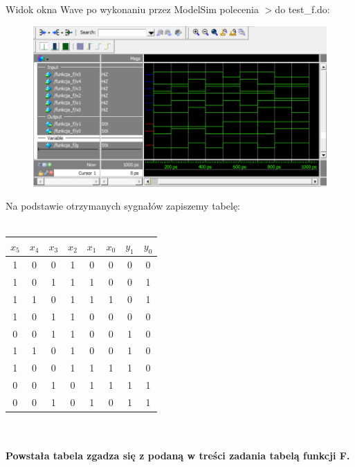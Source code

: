 \documentclass[]{article}
\begin{document}
\newpage
\par Widok okna Wave po wykonaniu przez ModelSim polecenia $>$do test\_f.do:
\begin{figure}[H]
	\includegraphics[width=1.25\textwidth]{wave.png}
\end{figure}
Na podstawie otrzymanych sygnałów zapiszemy tabelę:
\\
\\
\begin{tabular}[]{|c c c c c c |c c|}
\hline
$x_5$ & $x_4$ & $x_3$ & $x_2$ & $x_1$ & $x_0$ & $y_1$ & $y_0$ \\\hline
1 & 0 & 0 & 1 & 0 & 0 & 0 & 0\\
1 & 0 & 1 & 1 & 1 & 0 & 0 & 1\\
1 & 1 & 0 & 1 & 1 & 1 & 0 & 1\\
1 & 0 & 1 & 1 & 0 & 0 & 0 & 0\\
0 & 0 & 1 & 1 & 0 & 0 & 1 & 0\\
1 & 1 & 0 & 1 & 0 & 0 & 1 & 0\\
1 & 0 & 0 & 1 & 1 & 1 & 1 & 0\\
0 & 0 & 1 & 0 & 1 & 1 & 1 & 1\\
0 & 0 & 1 & 0 & 1 & 0 & 1 & 1\\ \hline
\end{tabular}
\\
\\ \textbf{Powstała tabela zgadza się z podaną w treści zadania tabelą funkcji F.}
\end{document}
